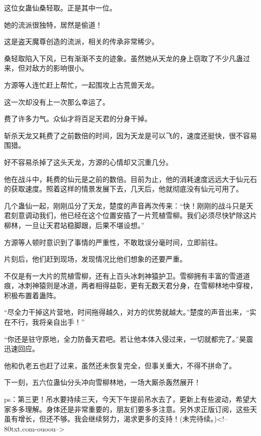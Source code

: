\begin{this_body}
这位女蛊仙桑轻取。正是其中一位。

她的流派很独特，居然是偷道！

这是盗天魔尊创造的流派，相关的传承非常稀少。

桑轻取陷入下风，已有渐渐不支的迹象。虽然她从天龙的身上窃取了不少凡蛊过来，但对敌方的影响很小。

方源等人连忙赶上帮忙，一起围攻上古荒兽天龙。

这一次却没有上一次那么幸运了。

费了许多力气。众仙才将百足天君的分身干掉。

斩杀天龙又耗费了之前数倍的时间，因为天龙是可以飞的，速度还挺快，很不容易围猎。

好不容易杀掉了这头天龙，方源的心情却又沉重几分。

他在战斗中，耗费的仙元是之前的数倍。目前为止，他的消耗速度远远大于仙元石的获取速度。照着这样的情景发展下去，几天后，他就彻底没有仙元可用了。

几个蛊仙一起，刚刚瓜分了天龙，楚度的声音再次传来：“快！刚刚的战斗只是天君刻意调动我们，他已经在这个位置安插了一片荒植雪柳。我们必须尽快铲除这片柳林，一旦让天君站稳脚跟，后果不堪设想。”

方源等人顿时意识到了事情的严重性，不敢耽误分毫时间，立即前往。

片刻后，他们赶到现场，发现情况比他们想象的还要严重。

不仅是有一大片的荒植雪柳，还有上百头冰刺神猿护卫。雪柳拥有丰富的雪道道痕，冰刺神猿则是冰道，两者相得益彰，更有无数天君分身，在雪柳林地中穿梭，积极布置着蛊阵。

“尽全力干掉这片营地，时间拖得越久，对方的优势就越大。”楚度的声音出来，“实在不行，我将亲自出手！”

“你还是驻守原地，全力防备天君吧。若让他本体入侵过来，一切就都完了。”昊震迅速回应。

他和仇老五也赶了过来，虽然还未恢复完全，但事关重大，不得不拼命了。

下一刻，五六位蛊仙分头冲向雪柳林地，一场大厮杀轰然展开！

ps：第三更！吊水要持续三天，今天下午提前吊水去了，更新上有些波动，希望大家多多理解。身体还是非常重要的，朋友们要多多注意。另外求正版订阅，这些天虽有增长，但还不够。我会继续努力，渴求更多的支持！(未完待续。)<!--80txt.com-ouoou-->

\end{this_body}

